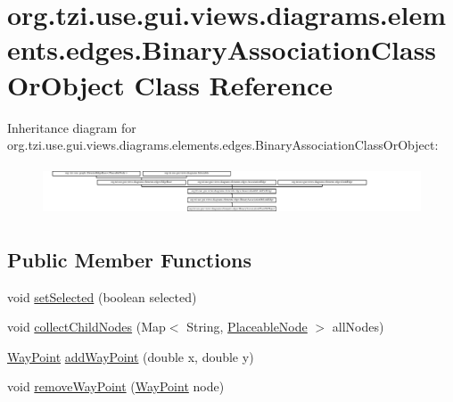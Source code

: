 \hypertarget{classorg_1_1tzi_1_1use_1_1gui_1_1views_1_1diagrams_1_1elements_1_1edges_1_1_binary_association_class_or_object}{\section{org.\-tzi.\-use.\-gui.\-views.\-diagrams.\-elements.\-edges.\-Binary\-Association\-Class\-Or\-Object Class Reference}
\label{classorg_1_1tzi_1_1use_1_1gui_1_1views_1_1diagrams_1_1elements_1_1edges_1_1_binary_association_class_or_object}
}
Inheritance diagram for org.\-tzi.\-use.\-gui.\-views.\-diagrams.\-elements.\-edges.\-Binary\-Association\-Class\-Or\-Object\-:\begin{figure}[H]
\begin{center}
\leavevmode
\includegraphics[height=1.486200cm]{classorg_1_1tzi_1_1use_1_1gui_1_1views_1_1diagrams_1_1elements_1_1edges_1_1_binary_association_class_or_object}
\end{center}
\end{figure}
\subsection*{Public Member Functions}
\begin{DoxyCompactItemize}
\item 
void \hyperlink{classorg_1_1tzi_1_1use_1_1gui_1_1views_1_1diagrams_1_1elements_1_1edges_1_1_binary_association_class_or_object_ad55372eaa16b75f1acd7687941a9a9cf}{set\-Selected} (boolean selected)
\item 
void \hyperlink{classorg_1_1tzi_1_1use_1_1gui_1_1views_1_1diagrams_1_1elements_1_1edges_1_1_binary_association_class_or_object_ae50bd565f2e11137ed7d6c3c438d74f2}{collect\-Child\-Nodes} (Map$<$ String, \hyperlink{classorg_1_1tzi_1_1use_1_1gui_1_1views_1_1diagrams_1_1elements_1_1_placeable_node}{Placeable\-Node} $>$ all\-Nodes)
\item 
\hyperlink{classorg_1_1tzi_1_1use_1_1gui_1_1views_1_1diagrams_1_1waypoints_1_1_way_point}{Way\-Point} \hyperlink{classorg_1_1tzi_1_1use_1_1gui_1_1views_1_1diagrams_1_1elements_1_1edges_1_1_binary_association_class_or_object_a9763cd10ac5376fe28513076d1833a7f}{add\-Way\-Point} (double x, double y)
\item 
void \hyperlink{classorg_1_1tzi_1_1use_1_1gui_1_1views_1_1diagrams_1_1elements_1_1edges_1_1_binary_association_class_or_object_aeddc427796c8170abc7ab5f93f8102ce}{remove\-Way\-Point} (\hyperlink{classorg_1_1tzi_1_1use_1_1gui_1_1views_1_1diagrams_1_1waypoints_1_1_way_point}{Way\-Point} node)
\end{DoxyCompactItemize}
